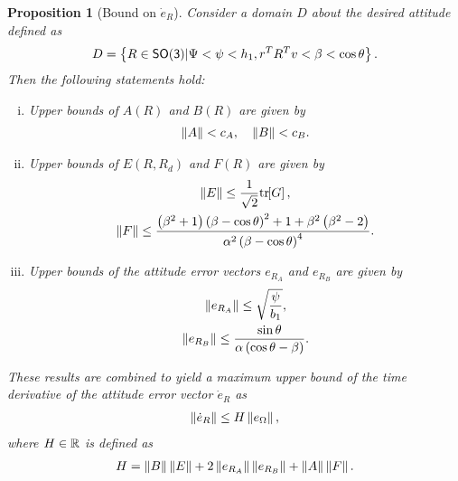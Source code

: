 \documentclass[letterpaper, 10 pt, conference]{ieeeconf}  %
\newtheorem{prop}{Proposition}
\begin{document}
\begin{prop}[Bound on \( \dot{e}_R \)]\label{prop:eR_dot_bound}
Consider a domain \( D \) about the desired attitude defined as
\begin{align}
	D = \left\{ R \in \mathsf{SO(3)} \vert \Psi < \psi < h_1, r^T R^T v < \beta < \cos \theta \right\}. \label{eqn:domain}
\end{align}
Then the following statements hold:
\begin{enumerate}[(i)]
	\item \label{item:prop_eR_dot_bound_AB} Upper bounds of \( A(R) \) and \( B(R) \) are given by
	\begin{gather}
		\left\| A \right\| < c_A  , \quad \left\| B \right\| < c_B . \label{eqn:AB_bound}
	\end{gather}
	\item \label{item:prop_eR_dot_bound_EF} Upper bounds of \( E(R,R_d) \) and \( F(R) \) are given by
	\begin{gather}
		\left\| E \right\| \leq \frac{1}{\sqrt{2}} \mathrm{tr}\negthickspace\left[ G \right]  , \label{eqn:E_bound} \\
		\left\| F \right\| \leq \frac{\left( \beta^2 + 1 \right)\left( \beta - \cos \theta \right)^2 + 1 + \beta^2 \left( \beta^2-2 \right)}{\alpha^2 \left( \beta-\cos \theta \right)^4} . \label{eqn:F_bound}
	\end{gather}
	\item Upper bounds of the attitude error vectors \( e_{R_A} \) and \( e_{R_B} \) are given by
	\begin{gather}
		\left\| e_{R_A} \right\| \leq \sqrt{\frac{\psi}{b_1}}, \label{eqn:eRA_bound} \\
		\left\| e_{R_B} \right\| \leq \frac{\sin\theta}{\alpha \left( \cos \theta - \beta \right)}. \label{eqn:eRB_bound}
	\end{gather}
\end{enumerate}
These results are combined to yield a maximum upper bound of the time derivative of the attitude error vector \( \dot{e}_R \) as
\begin{gather}
	\left\| \dot{e}_R \right\| \leq H \left\| e_\Omega \right\| ,\label{eqn:eR_bound}
\end{gather}
where  \( H \in \mathbb{R} \) is defined as
\begin{gather}
	H = \left\| B \right\| \left\| E \right\| + 2 \left\| e_{R_A} \right\| \left\| e_{R_B} \right\| + \left\| A \right\|\left\| F \right\|. \label{eqn:H}
\end{gather}
\end{prop}
\end{document}

